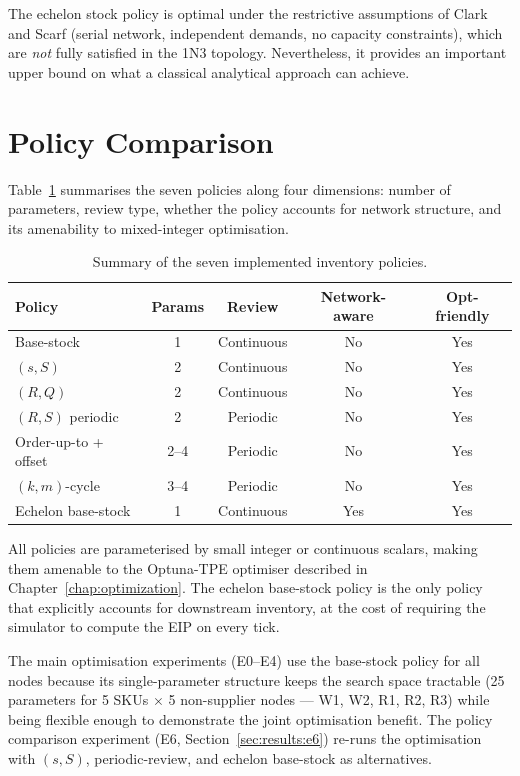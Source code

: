 The echelon stock policy is optimal under the restrictive assumptions
of Clark and Scarf (serial network, independent demands, no capacity
constraints), which are \emph{not} fully satisfied in the 1N3 topology.
Nevertheless, it provides an important upper bound on what a classical
analytical approach can achieve.

\section{Policy Comparison}
\label{sec:policies:comparison}

Table~\ref{tab:policy-summary} summarises the seven policies along four
dimensions: number of parameters, review type, whether the policy
accounts for network structure, and its amenability to mixed-integer
optimisation.

\begin{table}[htbp]
  \centering
  \caption{Summary of the seven implemented inventory policies.}
  \label{tab:policy-summary}
  \renewcommand{\arraystretch}{1.2}
  \begin{tabular}{@{}lcccc@{}}
    \toprule
    Policy & Params & Review & Network-aware & Opt-friendly \\
    \midrule
    Base-stock        & 1 & Continuous & No  & Yes \\
    $(s,S)$           & 2 & Continuous & No  & Yes \\
    $(R,Q)$           & 2 & Continuous & No  & Yes \\
    $(R,S)$ periodic  & 2 & Periodic   & No  & Yes \\
    Order-up-to + offset & 2--4 & Periodic & No & Yes \\
    $(k,m)$-cycle     & 3--4 & Periodic   & No  & Yes \\
    Echelon base-stock & 1 & Continuous & Yes & Yes \\
    \bottomrule
  \end{tabular}
\end{table}

All policies are parameterised by small integer or continuous scalars,
making them amenable to the Optuna-TPE optimiser described in
Chapter~\ref{chap:optimization}.  The echelon base-stock policy is the
only policy that explicitly accounts for downstream inventory, at the cost
of requiring the simulator to compute the EIP on every tick.

The main optimisation experiments (E0--E4) use the base-stock policy
for all nodes because its single-parameter structure keeps the search
space tractable (25 parameters for 5 SKUs $\times$ 5 non-supplier
nodes — W1, W2, R1, R2, R3) while being flexible enough to demonstrate
the joint optimisation benefit.  The policy comparison experiment (E6,
Section~\ref{sec:results:e6}) re-runs the optimisation with $(s,S)$,
periodic-review, and echelon base-stock as alternatives.
